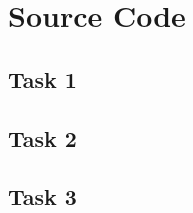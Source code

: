\section{Source Code}

\subsection{Task 1}



\pagebreak

\subsection{Task 2}



\pagebreak

\subsection{Task 3}


